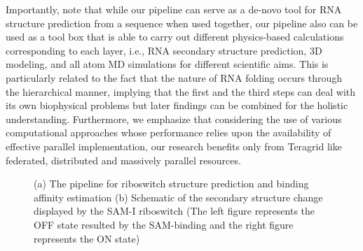 \documentclass[a4paper,10pt]{article}
\begin{document}
Importantly, note that while our pipeline can serve as a de-novo tool for RNA structure prediction from a sequence when used together, our pipeline also can be used as a tool box that is able to carry out different physics-based calculations corresponding to each layer, i.e., RNA secondary structure prediction, 3D modeling, and all atom MD simulations for different scientific aims.  This is particularly related to the fact that the nature of RNA folding occurs through the hierarchical manner, implying that the first and the third steps can deal with its own biophysical problems but later findings can be combined for the holistic understanding.  Furthermore, we emphasize that considering the use of various computational approaches whose performance relies upon the availability of effective parallel implementation, our research benefits only from Teragrid like federated, distributed and massively parallel resources.

\begin{figure}
\begin{center}
\end{center}
\caption{(a) The pipeline for riboswitch structure prediction and binding affinity estimation (b) Schematic of the secondary structure change displayed by the SAM-I riboswitch (The left figure represents the OFF state resulted by the SAM-binding and the right figure represents the ON state)}
\label{fig:ribo-pipeline}
\end{figure}
\end{document}
